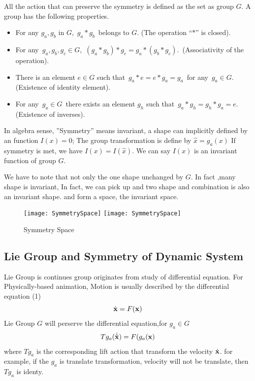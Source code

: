 All the action that can preserve the symmetry is defined as the set as group $G$.
A group has the following properties.
\begin{itemize}
\item For any $g_a,g_b$ in $G$, \,$g_a*g_b$\, belongs to $G$. (The operation
``$*$'' is closed).

\item For any \,$g_a,g_b,g_c\in G$, \,$(g_a*g_b)*g_c=g_a*(g_b*g_c)$. \,(Associativity of
the operation).

\item There is an element $e\in G$ such that \,$g_a*e=e*g_a=g_a$\, for any
\,$g_a\in G$. (Existence of identity element).

\item For any \,$g_a\in G$\, there exists an element $g_h$ such that
\,$g_a*g_h=g_h*g_a=e$. \,(Existence of inverses).
\end{itemize}



In algebra sense, ''Symmetry'' means invariant, a shape can implicitly defined by an function $I(x)=0$;
The group transformation is define by $\hat{x}=g_a(x)$
If symmetry is met, we have $I(x)=I(\hat{x})$.
We can say $I(x)$ is an invariant function of group $G$.

We have to note that not only the one shape unchanged by $G$.
In fact ,many shape is invariant, 
In fact, we can pick up and two shape and combination is also an invariant shape. 
and form a space, the invariant space.


\begin{figure}[!htbp]
  \begin{center}
    \leavevmode
    \ifpdf
      \texttt{[image: SymmetrySpace]}
    \else
      \texttt{[image: SymmetrySpace]}
    \fi
    \caption{Symmetry Space}
    \label{fig:symmetry Space}
\end{center}
\end{figure}





\subsection{Lie Group and Symmetry of Dynamic System}
Lie Group is continues group originates from study of differential equation.
For Physically-based animation,
Motion is usually described by the differential equation (1)
\begin{equation}
	\dot{\mathbf{x}}=F(\mathbf{x})
\end{equation}
Lie Group $G$ will perserve the differential equation,for $g_a \in G$ 
\[
Tg_a(\dot{\hat{\mathbf{x}}})=F(g_a(\mathbf{x})
\]
where $Tg_a$ is the corresponding lift action that transform the velocity $\dot{\mathbf{x}}$.
for example, if the $g_a$ is translate transformation, velocity will not be translate, then $Tg_a$ is identy.





